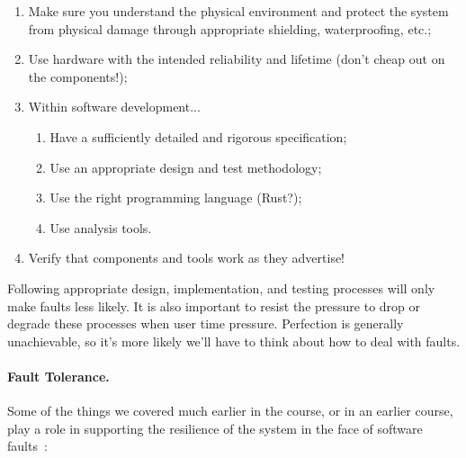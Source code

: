 \begin{enumerate}
	\item Make sure you understand the physical environment and protect the system from physical damage through appropriate shielding, waterproofing, etc.;
	\item Use hardware with the intended reliability and lifetime (don't cheap out on the components!);
	\item Within software development...
		\begin{enumerate}
			\item Have a sufficiently detailed and rigorous specification;
			\item Use an appropriate design and test methodology;
			\item Use the right programming language (Rust?);
			\item Use analysis tools.
		\end{enumerate}
	\item Verify that components and tools work as they advertise!
\end{enumerate}

Following appropriate design, implementation, and testing processes will only make faults less likely. It is also important to resist the pressure to drop or degrade these processes when user time pressure. Perfection is generally unachievable, so it's more likely we'll have to think about how to deal with faults.

\paragraph{Fault Tolerance.}
Some of the things we covered much earlier in the course, or in an earlier course, play a role in supporting the resilience of the system in the face of software faults~\cite{osi}:

